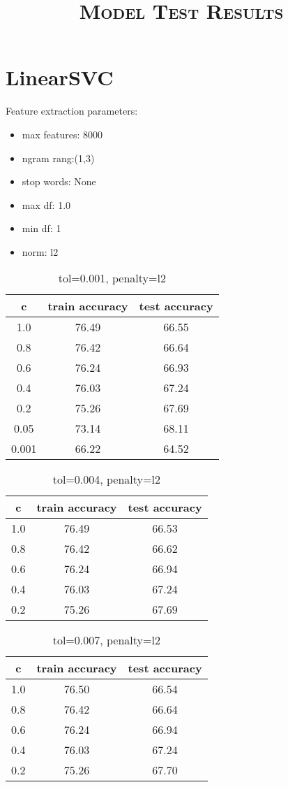 \documentclass[a4paper,10pt]{article}
\title{\Huge{\textbf{\textsc{Model Test Results}}}}
\date{}
\begin{document}
\maketitle
\section{LinearSVC}
\par Feature extraction parameters:
\begin{itemize}
\item max features: 8000
\item ngram rang:(1,3)
\item stop words: None
\item max df: 1.0
\item min df: 1
\item norm: l2
\end{itemize}

\begin{table}[h]
\centering
\begin{tabular}{|c|c|c|}
\hline
c&train accuracy&test accuracy\\
\hline
1.0&76.49&66.55\\
\hline
0.8&76.42&66.64\\
\hline
0.6&76.24&66.93\\
\hline
0.4&76.03&67.24\\
\hline
0.2&75.26&67.69\\
\hline
0.05&73.14&68.11\\
\hline
0.001&66.22&64.52\\
\hline
\end{tabular}
\caption{tol=0.001, penalty=l2}
\end{table}

\begin{table}[h]
\centering
\begin{tabular}{|c|c|c|}
\hline
c&train accuracy&test accuracy\\
\hline
1.0&76.49&66.53\\
\hline
0.8&76.42&66.62\\
\hline
0.6&76.24&66.94\\
\hline
0.4&76.03&67.24\\
\hline
0.2&75.26&67.69\\
\hline
\end{tabular}
\caption{tol=0.004, penalty=l2}
\end{table}

\begin{table}[h]
\centering
\begin{tabular}{|c|c|c|}
\hline
c&train accuracy&test accuracy\\
\hline
1.0&76.50&66.54\\
\hline
0.8&76.42&66.64\\
\hline
0.6&76.24&66.94\\
\hline
0.4&76.03&67.24\\
\hline
0.2&75.26&67.70\\
\hline
\end{tabular}
\caption{tol=0.007, penalty=l2}
\end{table}
\end{document}
